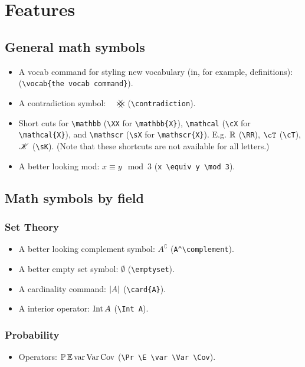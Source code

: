 \documentclass[10pt,letterpaper]{amsart}
\begin{document}
\section{Features}

\subsection{General math symbols}
\begin{itemize}
  \item A vocab command for styling new vocabulary (in, for example, definitions):  (\verb|\vocab{the vocab command}|). 
  \item A contradiction symbol: \(\contradiction\) (\verb|\contradiction|). 
  \item Short cuts for \verb|\mathbb| (\verb|\XX| for \verb|\mathbb{X}|), \verb|\mathcal| (\verb|\cX| for \verb|\mathcal{X}|), and \verb|\mathscr| (\verb|\sX| for \verb|\mathscr{X}|). E.g. \(\mathbb{R}\) (\verb|\RR|), \(\cT\) (\verb|\cT|), \(\mathscr{K}\) (\verb|\sK|). (Note that these shortcuts are not available for all letters.)
  
  \item A better looking mod: \(x \equiv y \mod 3\) (\verb|x \equiv y \mod 3|). 
\end{itemize}


\subsection{Math symbols by field}
\subsubsection*{Set Theory}
\begin{itemize}
  \item A better looking complement symbol: \(A^\complement\) (\verb|A^\complement|).
  \item A better empty set symbol: \(\emptyset\) (\verb|\emptyset|). 
  \item A cardinality command: \(\left|A\right|\) (\verb|\card{A}|). 
  \item A interior operator: \(\operatorname{Int} A\) (\verb|\Int A|). 
\end{itemize}

\subsubsection*{Probability}
\begin{itemize} 
  \item Operators: \(\mathbb{P} \operatorname{\mathbb{E}} \operatorname{var} \operatorname{Var} \operatorname{Cov}\) (\verb|\Pr \E \var \Var \Cov|). 
\end{itemize}
\end{document}
